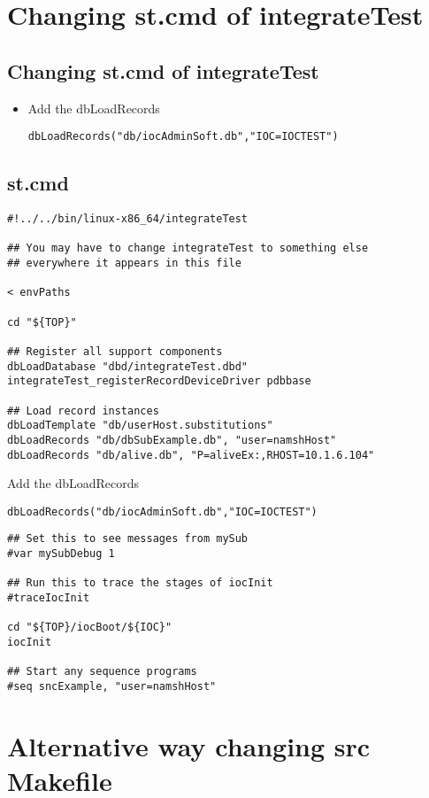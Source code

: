 \documentclass[11pt
  , a4paper
  , article
  , oneside
]{memoir}
\begin{document}
\section{Changing st.cmd of integrateTest}
\subsection{Changing st.cmd of integrateTest}
\begin{itemize}
	\item Add the dbLoadRecords
	\begin{lstlisting}[style=termstyle]
dbLoadRecords("db/iocAdminSoft.db","IOC=IOCTEST")
\end{lstlisting}
\end{itemize}
\subsection{st.cmd}
\begin{lstlisting}[style=termstyle]
#!../../bin/linux-x86_64/integrateTest

## You may have to change integrateTest to something else
## everywhere it appears in this file

< envPaths

cd "${TOP}"

## Register all support components
dbLoadDatabase "dbd/integrateTest.dbd"
integrateTest_registerRecordDeviceDriver pdbbase

## Load record instances
dbLoadTemplate "db/userHost.substitutions"
dbLoadRecords "db/dbSubExample.db", "user=namshHost"
dbLoadRecords "db/alive.db", "P=aliveEx:,RHOST=10.1.6.104"
\end{lstlisting}
Add the dbLoadRecords
\begin{lstlisting}[style=termstyle]
dbLoadRecords("db/iocAdminSoft.db","IOC=IOCTEST")
\end{lstlisting}
\begin{lstlisting}[style=termstyle]
## Set this to see messages from mySub
#var mySubDebug 1

## Run this to trace the stages of iocInit
#traceIocInit

cd "${TOP}/iocBoot/${IOC}"
iocInit

## Start any sequence programs
#seq sncExample, "user=namshHost"

\end{lstlisting}
\section{Alternative way changing src Makefile}
\end{document}
